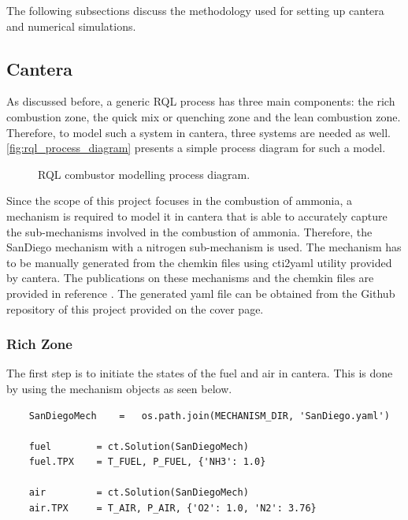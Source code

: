 The following subsections discuss the methodology used for setting up cantera and numerical simulations.


\subsection{Cantera} 

As discussed before, a generic RQL process has three main components: the rich combustion zone, the quick mix or quenching zone and the lean combustion zone. Therefore, to model such a system in cantera, three systems are needed as well. \autoref{fig:rql_process_diagram} presents a simple process diagram for such a model.

\begin{figure}[H]
    \centering
    
    \caption{RQL combustor modelling process diagram.}\label{fig:rql_process_diagram}
\end{figure}

Since the scope of this project focuses in the combustion of ammonia, a mechanism is required to model it in cantera that is able to accurately capture the sub-mechanisms involved in the combustion of ammonia. Therefore, the SanDiego mechanism with a nitrogen sub-mechanism is used. The mechanism has to be manually generated from the chemkin files using cti2yaml utility provided by cantera. The publications on these mechanisms and the chemkin files are provided in reference \cite{SanDiegoMechanism}. The generated yaml file can be obtained from the Github repository of this project provided on the cover page.

\subsubsection{Rich Zone}

The first step is to initiate the states of the fuel and air in cantera. This is done by using the mechanism objects as seen below.

\begin{verbatim}
    SanDiegoMech    =   os.path.join(MECHANISM_DIR, 'SanDiego.yaml')

    fuel        = ct.Solution(SanDiegoMech)
    fuel.TPX    = T_FUEL, P_FUEL, {'NH3': 1.0}

    air         = ct.Solution(SanDiegoMech)
    air.TPX     = T_AIR, P_AIR, {'O2': 1.0, 'N2': 3.76}
\end{verbatim}



